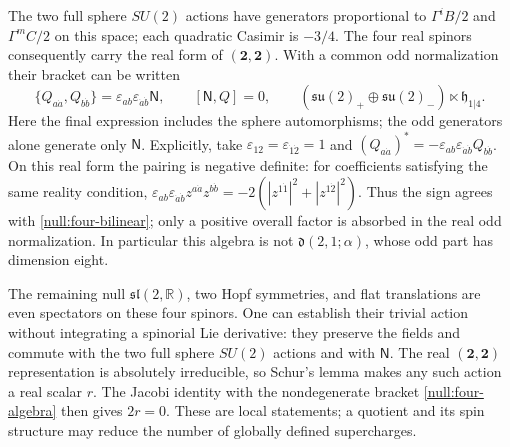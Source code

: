 The two full sphere $SU(2)$ actions have generators proportional to $\Gamma^iB/2$ and $\Gamma^mC/2$ on this space; each quadratic Casimir is $-3/4$. The four real spinors consequently carry the real form of $(\mathbf2,\mathbf2)$. With a common odd normalization their bracket can be written
\begin{equation}\label{null:four-algebra}
 \{Q_{a\dot a},Q_{b\dot b}\}
   =\varepsilon_{ab}\varepsilon_{\dot a\dot b}\mathsf N,
 \qquad[\mathsf N,Q]=0,
 \qquad
 (\mathfrak{su}(2)_+\oplus\mathfrak{su}(2)_-)\ltimes\mathfrak h_{1|4}.
\end{equation}
Here the final expression includes the sphere automorphisms; the odd generators alone generate only $\mathsf N$. Explicitly, take $\varepsilon_{12}=\varepsilon_{\dot1\dot2}=1$ and $(Q_{a\dot a})^*=-\varepsilon_{ab}\varepsilon_{\dot a\dot b}Q_{b\dot b}$. On this real form the pairing is negative definite: for coefficients satisfying the same reality condition, $\varepsilon_{ab}\varepsilon_{\dot a\dot b}z^{a\dot a}z^{b\dot b}=-2(|z^{1\dot1}|^2+|z^{1\dot2}|^2)$. Thus the sign agrees with \eqref{null:four-bilinear}; only a positive overall factor is absorbed in the real odd normalization. In particular this algebra is not $\mathfrak d(2,1;\alpha)$, whose odd part has dimension eight.

The remaining null $\mathfrak{sl}(2,\mathbb R)$, two Hopf symmetries, and flat translations are even spectators on these four spinors. One can establish their trivial action without integrating a spinorial Lie derivative: they preserve the fields and commute with the two full sphere $SU(2)$ actions and with $\mathsf N$. The real $(\mathbf2,\mathbf2)$ representation is absolutely irreducible, so Schur's lemma makes any such action a real scalar $r$. The Jacobi identity with the nondegenerate bracket \eqref{null:four-algebra} then gives $2r=0$. These are local statements; a quotient and its spin structure may reduce the number of globally defined supercharges.
